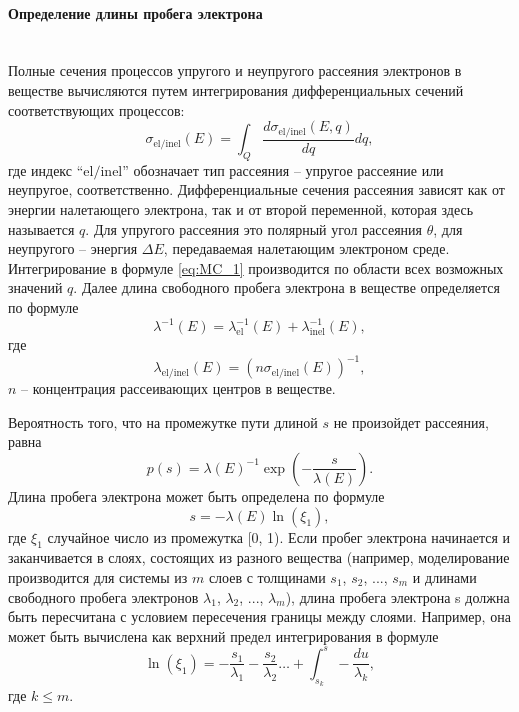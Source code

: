 \paragraph{Определение длины пробега электрона} \mbox{} \\
\indent Полные сечения процессов упругого и неупругого рассеяния электронов в веществе вычисляются путем интегрирования дифференциальных сечений соответствующих процессов:
\begin{equation} \label{eq:MC_1}
	\sigma_\mathrm{el/inel}(E) = \int_Q \frac{d \sigma_\mathrm{el/inel}(E, q)}{dq} dq,
\end{equation}
где индекс ``$\mathrm{el/inel}$'' обозначает тип рассеяния -- упругое рассеяние или неупругое, соответственно. Дифференциальные сечения рассеяния зависят как от энергии налетающего электрона, так и от второй переменной, которая здесь называется $q$. Для упругого рассеяния это полярный угол рассеяния $\theta$, для неупругого -- энергия $\Delta E$, передаваемая налетающим электроном среде. Интегрирование в формуле \ref{eq:MC_1} производится по области всех возможных значений $q$. Далее длина свободного пробега электрона в веществе определяется по формуле
\begin{equation} \label{eq:MC_4}
	\lambda^{-1}(E) = \lambda_\mathrm{el}^{-1}(E)+\lambda_\mathrm{inel}^{-1}(E),
\end{equation}
где
\begin{equation} \label{eq:MC_3}
	\lambda_\mathrm{el/inel}(E)=\left(n \sigma_\mathrm{el/inel}(E)\right)^{-1},
\end{equation}
$n$ -- концентрация рассеивающих центров в веществе.

Вероятность того, что на промежутке пути длиной $s$ не произойдет рассеяния, равна~\cite{ME_rev_49}
\begin{equation} \label{eq:MC_5}
	p(s) = \lambda(E)^{-1} \exp \left(-\frac{s}{\lambda(E)}\right).
\end{equation}
Длина пробега электрона может быть определена по формуле
\begin{equation} \label{eq:MC_6}
	s = -\lambda(E) \ln \left(\xi_1\right),
\end{equation}
где $\xi_1$ случайное число из промежутка [0, 1). Если пробег электрона начинается и заканчивается в слоях, состоящих из разного вещества (например, моделирование производится для системы из $m$ слоев с толщинами $s_1$, $s_2$, ..., $s_m$ и длинами свободного пробега электронов $\lambda_1$, $\lambda_2$, ..., $\lambda_m$), длина пробега электрона s должна быть пересчитана с условием пересечения границы между слоями. Например, она может быть вычислена как верхний предел интегрирования в формуле~\cite{Han_2002}
\begin{equation} \label{eq:MC_7}
	\ln \left(\xi_1\right)=-\frac{s_1}{\lambda_1}-\frac{s_2}{\lambda_2} \ldots+\int_{s_k}^s-\frac{d u}{\lambda_k},
\end{equation}
где $k \leq m$.


